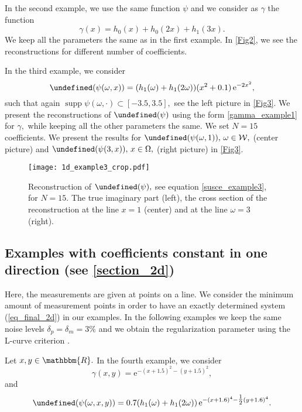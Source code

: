 \documentclass[a4paper,twoside,10pt]{article}
\theoremstyle{break}
\theoremstyle{nonumberplain}
\newcommand{\R}{\mathbbm{R}}
\newcommand{\e}{\mathrm e}
\let\IM\Im
\let\Im=\undefined
\DeclareMathOperator{\Im}{\IM m}
\DeclareMathOperator{\supp}{supp}
\begin{document}
In the second example, we use the same function $\psi$ and we consider as $\gamma$ the function
\begin{equation}\label{gamma_example2}
\gamma (x) = h_0 (x) + h_0 (2x) + h_1 (3x) .
\end{equation}
We keep all the parameters the same as in the first example. In \autoref{Fig2}, we see the reconstructions for different number of coefficients. 

In the third example, we consider 
\begin{equation}\label{susce_example3}
\Im (\psi (\omega,x)) = (h_1 (\omega)+h_1 (2\omega) )(x^2 + 0.1) \, \e^{-2x^2} ,
\end{equation}
such that again $\supp \psi (\omega,\cdot ) \subset [-3.5,3.5],$ see the left picture in \autoref{Fig3}. We present the reconstructions of $\Im(\psi)$ using the form \eqref{gamma_example1} for $\gamma,$  while keeping all the other parameters the same. We set $N=15$ coefficients. We present the results for $\Im (\psi (\omega,1)), \, \omega \in \mathcal{W},$ (center picture) and $\Im (\psi (3,x)), \, x\in \Omega ,$
(right picture) in  \autoref{Fig3}.

\begin{figure}[t]
\begin{center}
\texttt{[image: 1d\_example3\_crop.pdf]}
\caption{Reconstruction of $\Im (\psi ),$ see equation \eqref{susce_example3}, for $N=15$. The true imaginary part (left), the cross section of the reconstruction at the line $x=1$ (center) and at the line $\omega=3$ (right).}\label{Fig3}
\end{center}
\end{figure}

\subsection{Examples with coefficients constant in one direction (see \autoref{section_2d})}

Here, the measurements are given at points on a line. We consider the minimum amount of measurement points in order to have an exactly determined system (\ref{eq_final_2d}) in our examples. 
In the following examples we keep the same noise levels $\delta_p = \delta_m = 3\%$ and we obtain the regularization parameter using the L-curve criterion \cite{HanOle93}. 

Let $x,y  \in \R .$  In the fourth example, we consider
\begin{equation}\label{gamma_example4}
\gamma (x,y) = \e^{ -(x+1.5)^2- (y+1.5)^2},
\end{equation}
and
\begin{equation}\label{susce_example4}
\Im (\psi (\omega,x,y)) = 0.7 (h_1 (\omega)+h_1 (2\omega)) \, \e^{ -(x+1.6)^4- \tfrac12 (y+1.6)^4}.
\end{equation}
\end{document}
